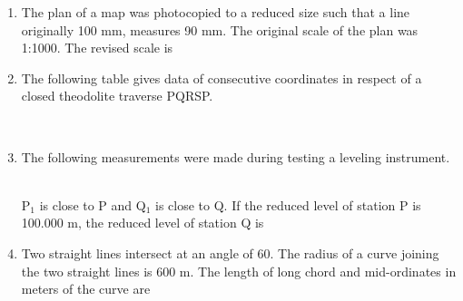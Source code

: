 \documentclass[journal,12pt,onecolumn]{IEEEtran}
\theoremstyle{remark}
\begin{document}
\begin{enumerate}
\begin{enumerate}
\begin{multicols}{4}
\end{multicols}
\end{enumerate}
\item The plan of a map was photocopied to a reduced size such that a line originally 100 mm, measures 90 mm. The original scale of the plan was 1:1000. The revised scale is
\begin{enumerate}
\end{enumerate}
\item The following table gives data of consecutive coordinates in respect of a closed theodolite traverse PQRSP. \\
\begin{table}[h]
    \centering
    
\end{table}\\
\begin{enumerate}
\end{enumerate}
\item The following measurements were made during testing a leveling instrument.
\begin{table}[h]
    \centering
    
\end{table}\\
P$_1$ is close to P and Q$_1$ is close to Q. If the reduced level of station P is 100.000 m, the reduced level of station Q is
\begin{enumerate}
\end{enumerate}
\item Two straight lines intersect at an angle of 60\degree. The radius of a curve joining the two straight lines is 600 m. The length of long chord and mid-ordinates in meters of the curve are
\begin{enumerate}
\end{enumerate}
\end{enumerate}
\end{document}
